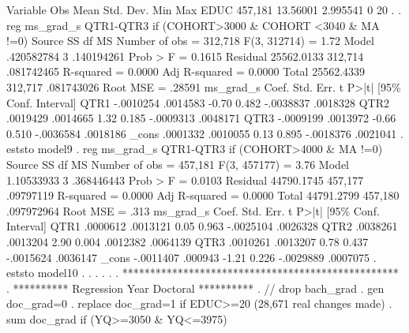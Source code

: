    Variable {\VBAR}        Obs        Mean    Std. Dev.       Min        Max
        EDUC {\VBAR}    457,181    13.56001    2.995541          0         20
{\smallskip}
. 
. reg ms_grad_s QTR1-QTR3  if (COHORT>3000 \& COHORT <3040 \& MA !=0)
{\smallskip}
      Source {\VBAR}       SS           df       MS      Number of obs   =   312,718
   F(3, 312714)    =      1.72
       Model {\VBAR}  .420582784         3  .140194261   Prob > F        =    0.1615
    Residual {\VBAR}  25562.0133   312,714  .081742465   R-squared       =    0.0000
   Adj R-squared   =    0.0000
       Total {\VBAR}  25562.4339   312,717  .081743026   Root MSE        =    .28591
{\smallskip}
   ms_grad_s {\VBAR}      Coef.   Std. Err.      t    P>|t|     [95\% Conf. Interval]
        QTR1 {\VBAR}  -.0010254   .0014583    -0.70   0.482    -.0038837    .0018328
        QTR2 {\VBAR}   .0019429   .0014665     1.32   0.185    -.0009313    .0048171
        QTR3 {\VBAR}  -.0009199   .0013972    -0.66   0.510    -.0036584    .0018186
       _cons {\VBAR}   .0001332   .0010055     0.13   0.895    -.0018376    .0021041
{\smallskip}
. eststo model9
{\smallskip}
. reg ms_grad_s QTR1-QTR3  if (COHORT>4000 \& MA !=0)
{\smallskip}
      Source {\VBAR}       SS           df       MS      Number of obs   =   457,181
   F(3, 457177)    =      3.76
       Model {\VBAR}  1.10533933         3  .368446443   Prob > F        =    0.0103
    Residual {\VBAR}  44790.1745   457,177   .09797119   R-squared       =    0.0000
   Adj R-squared   =    0.0000
       Total {\VBAR}  44791.2799   457,180  .097972964   Root MSE        =      .313
{\smallskip}
   ms_grad_s {\VBAR}      Coef.   Std. Err.      t    P>|t|     [95\% Conf. Interval]
        QTR1 {\VBAR}   .0000612   .0013121     0.05   0.963    -.0025104    .0026328
        QTR2 {\VBAR}   .0038261   .0013204     2.90   0.004     .0012382    .0064139
        QTR3 {\VBAR}   .0010261   .0013207     0.78   0.437    -.0015624    .0036147
       _cons {\VBAR}  -.0011407    .000943    -1.21   0.226    -.0029889    .0007075
{\smallskip}
. eststo model10
{\smallskip}
. 
. 
. 
. 
. 
. **************************************************
. **********  Regression Year Doctoral **********
. // drop bach_grad
. gen doc_grad=0
{\smallskip}
. replace doc_grad=1 if EDUC>=20
(28,671 real changes made)
{\smallskip}
. sum doc_grad if (YQ>=3050 \& YQ<=3975)
